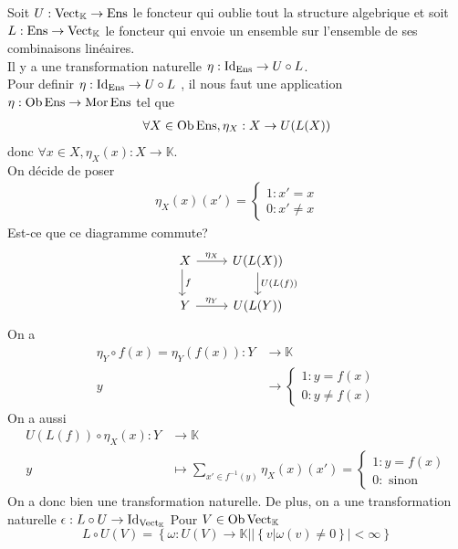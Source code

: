 \documentclass[../main.tex]{subfiles}
\begin{document}
\begin{exemple}
Soit $U: \operatorname{Vect}_{\mathbb{K}}\to \operatorname{Ens} $  le foncteur qui oublie tout la structure algebrique et soit $L: \operatorname{Ens} \to \operatorname{Vect}_{\mathbb{K}} $ le foncteur qui envoie un ensemble sur l'ensemble de ses combinaisons linéaires.\\
Il y a une transformation naturelle $\eta: \operatorname{Id}_{\operatorname{Ens}} \to U \circ L$.\\
Pour definir $\eta: \operatorname{Id}_{\operatorname{Ens}} \to U\circ L$ , il nous faut une application $\eta: \operatorname{Ob} \operatorname{Ens}\to  \operatorname{Mor} \operatorname{Ens}$ tel que
\begin{align*}
	\forall X \in \operatorname{Ob} \operatorname{Ens}, \eta_X : X \to U( L( X) ) 
\end{align*}
donc $\forall x \in X, \eta_X( x) : X \to \mathbb{K}$.\\
On décide de poser
\begin{align*}
\eta_X( x) ( x') = 
\begin{cases}
1 : x'=x\\
0: x' \neq x
\end{cases}
\end{align*}
Est-ce que ce diagramme commute?
\[ 
\begin{tikzcd}
X \arrow[d, "f", shift right] \arrow[r, "\eta_X"] & U(L(X)) \arrow[d, "U(L(f))"] \\
Y \arrow[r, "\eta_Y"]                             & U(L(Y))                     
\end{tikzcd}
\]
On a 
\begin{align*}
	\eta_Y \circ f( x) = \eta_Y ( f( x) ) : Y &\to \mathbb{K}\\
	y &\to
	\begin{cases}
		1: y =f( x) \\
		0: y \neq f( x) 
	\end{cases}
\end{align*}
On a aussi
\begin{align*}
	U( L( f) ) \circ \eta_X( x) : Y &\to \mathbb{K}\\
	y &\mapsto \sum_{x' \in f^{-1}( y) }  \eta_X( x) ( x') =
	\begin{cases}
		1 : y = f( x) \\
		0: \text{ sinon } 
	\end{cases}
\end{align*}
On a donc bien une transformation naturelle.
De plus, on a une transformation naturelle $\epsilon: L \circ U \to \operatorname{Id}_{\operatorname{Vect}_{\mathbb{K}} } $ 
Pour $V \in \operatorname{Ob} \operatorname{Vect}_{\mathbb{K}} $
\[ 
	L\circ U( V) = \left\{ \omega: U( V) \to \mathbb{K} | | \left\{ v | \omega( v) \neq 0 \right\} | < \infty  \right\} 
\]
\end{exemple}
\end{document}
